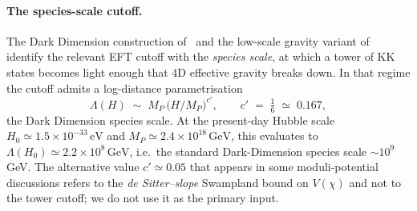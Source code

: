 \documentclass[epjc3,twocolumn]{svjour3}
\begin{document}
\paragraph{The species-scale cutoff.}
The Dark Dimension construction of~\cite{Montero2022}
and the low-scale gravity variant of~\cite{AAL2023}
identify the relevant EFT cutoff with the \emph{species scale}, at which
a tower of KK states becomes light enough that 4D effective gravity
breaks down. In that regime the cutoff admits a log-distance parametrisation
\begin{equation}
  \Lambda(H)\;\sim\;M_P\,\bigl(H/M_P\bigr)^{c'},
  \qquad
  c' \;=\; \tfrac{1}{6}\;\simeq\;0.167,
  \label{eq:Lambda_SDC}
\end{equation}
the Dark Dimension species scale.
At the present-day Hubble scale $H_0 \simeq 1.5\times 10^{-33}\,\mathrm{eV}$
and $M_P \simeq 2.4\times 10^{18}\,\mathrm{GeV}$, this evaluates to
$\Lambda(H_0)\simeq 2.2\times 10^{8}\,\mathrm{GeV}$, i.e.\ the standard
Dark-Dimension species scale $\sim 10^{9}$\,GeV. The alternative value
$c'\simeq 0.05$ that appears in some moduli-potential discussions refers
to the \emph{de Sitter--slope} Swampland bound on $V(\chi)$ and not to the
tower cutoff; we do not use it as the primary input.
\end{document}
